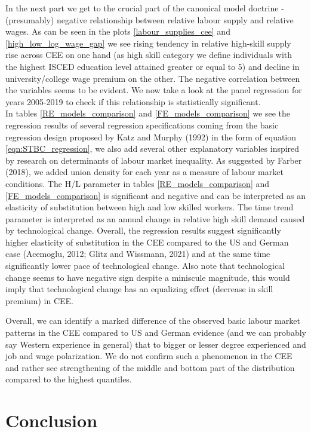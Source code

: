 \documentclass{article}
\begin{document}
In the next part we get to the crucial part of the canonical model doctrine - (presumably) negative relationship between relative labour supply and relative wages. As can be seen in the plots \ref{labour_supplies_cee} and \ref{high_low_log_wage_gap} we see rising tendency in relative high-skill supply rise across CEE on one hand (as high skill category we define individuals with the highest ISCED education level attained greater or equal to 5) and decline in university/college wage premium on the other. The negative correlation between the variables seems to be evident. We now take a look at the panel regression for years 2005-2019 to check if this relationship is statistically significant.\\
In tables \ref{RE_models_comparison} and \ref{FE_models_comparison}  we see the regression results of several regression specifications coming from the basic regression design proposed by Katz and Murphy (1992) in the form of equation \ref{eqn:STBC_regression}, we also add several other explanatory variables inspired by research on determinants of labour market inequality. As suggested by Farber (2018), we added union density for each year as a measure of labour market conditions. 
The H/L parameter in tables \ref{RE_models_comparison} and \ref{FE_models_comparison} is significant and negative and can be interpreted as an elasticity of substitution between high and low skilled workers. The time trend parameter is interpreted as an annual change in relative high skill demand caused by technological change.
Overall, the regression results suggest significantly higher elasticity of substitution in the CEE compared to the US and German case (Acemoglu, 2012; Glitz and Wissmann, 2021) and at the same time significantly lower pace of technological change. Also note that technological change seems to have negative sign despite a miniscule magnitude, this would imply that technological change has an equalizing effect (decrease in skill premium) in CEE.

Overall, we can identify a marked difference of the observed basic labour market patterns in the CEE compared to US and German evidence (and we can probably say Western experience in general) that to bigger or lesser degree experienced and job and wage polarization. We do not confirm such a phenomenon in the CEE and rather see strengthening of the middle and bottom part of the distribution compared to the highest quantiles.

\section{Conclusion}
\end{document}
